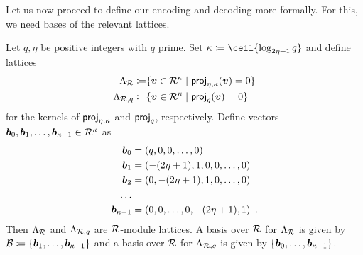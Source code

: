 Let us now proceed to define our encoding and decoding more formally. For this, we need bases of the relevant lattices.

\begin{proposition}\label{prop:kernellattices}
Let $q,\eta$ be positive integers with $q$ prime. Set $\limbs \coloneqq \ceil{ \log_{2\eta+1}q}$ and define lattices
\begin{align*}
\Lambda_{\mathcal{R}}    \coloneqq &\{\boldsymbol{v}\in\mathcal{R}^\kappa \mid \mathsf{proj}_{\eta,\kappa}(\boldsymbol{v}) = 0\}\\
\Lambda_{\mathcal{R},q} \coloneqq &\{\boldsymbol{v}\in\mathcal{R}^\kappa \mid \mathsf{proj}_{q}(\boldsymbol{v}) = 0\}\\
\end{align*}
for the kernels of $\mathsf{proj}_{\eta,\kappa}$ and $\mathsf{proj}_{q}$, respectively.
Define vectors $\boldsymbol{b}_0,\boldsymbol{b}_1,\ldots,\boldsymbol{b}_{\kappa-1} \in \mathcal{R}^\kappa$ as
\begin{align*}
\boldsymbol{b}_0 &= (q,0,0,\ldots, 0)\\
\boldsymbol{b}_1 &= (-(2\eta+1), 1, 0,0,\ldots, 0)\\
\boldsymbol{b}_2 &= (0, -(2\eta+1), 1, 0,\ldots, 0)\\
\ldots\\
\boldsymbol{b}_{\kappa-1}&=(0,0,\ldots,0, -(2\eta+1), 1)\enspace.
\end{align*}
Then $\Lambda_{\mathcal{R}}$ and $\Lambda_{\mathcal{R},q}$ are $\mathcal{R}$-module lattices. A basis over $\mathcal{R}$ for $\Lambda_{\mathcal{R}}$ is given by $\mathcal{B} \coloneqq \{\boldsymbol{b}_1,\ldots,\boldsymbol{b}_{\kappa-1}\}$ and
a basis over $\mathcal{R}$ for $\Lambda_{\mathcal{R},q}$ is given by $\{\boldsymbol{b}_0,\ldots,\boldsymbol{b}_{\kappa-1}\}$.
\end{proposition}
